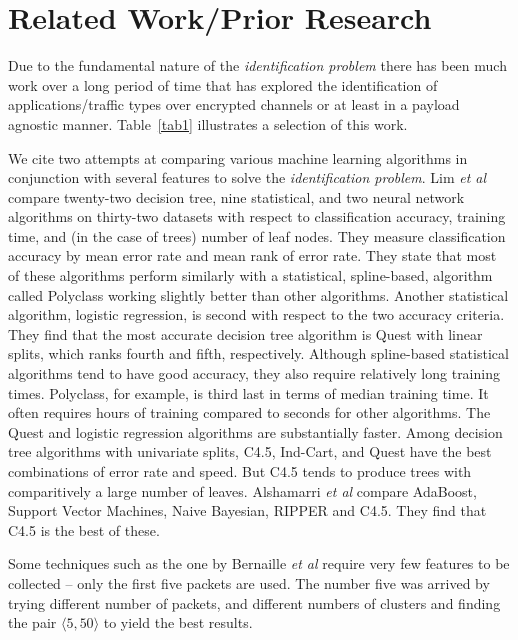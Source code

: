 \section{Related Work/Prior Research}
Due to the fundamental nature of the \emph{identification problem}
there has been much work over a long period of time
that has explored the identification of applications/traffic
types over encrypted channels or at least in a payload agnostic manner. 
Table~\ref{tab1} illustrates a selection of this work. 

We cite two attempts at comparing various machine learning algorithms
in conjunction with several features to solve the \emph{identification 
problem}. 
Lim \emph{et al} \cite{lim2000comparison} compare twenty-two decision
tree, nine statistical, and two neural network algorithms on
thirty-two datasets with respect to classification accuracy, training
time, and (in the case of trees) number of leaf nodes.  They measure
classification accuracy by mean error rate and mean rank of error
rate.  They state that most of these algorithms perform similarly with
a statistical, spline-based, algorithm called Polyclass working
slightly better than other algorithms.  Another statistical algorithm,
logistic regression, is second with respect to the two accuracy
criteria.  They find that the most accurate decision tree algorithm is
Quest with linear splits, which ranks fourth and fifth, respectively.
Although spline-based statistical algorithms tend to have good
accuracy, they also require relatively long training times. Polyclass,
for example, is third last in terms of median training time. It often
requires hours of training compared to seconds for other
algorithms. The Quest and logistic regression algorithms are
substantially faster. Among decision tree algorithms with univariate
splits, C4.5, Ind-Cart, and Quest have the best combinations of error
rate and speed. But C4.5 tends to produce trees with comparitively a
large number of leaves.
Alshamarri \emph{et al} \cite{alshammari2009machine} compare AdaBoost,
Support Vector Machines, Naive Bayesian, RIPPER and C4.5.  They find
that C4.5 is the best of these.



Some techniques such as the one by Bernaille \emph{et
  al}\cite{bernaille2006traffic} require very few features to be
collected -- only the first five packets are used. The number five was
arrived by trying different number of packets, and different numbers of 
clusters and finding the pair $\langle 5,50 \rangle$ to yield the best
results.


